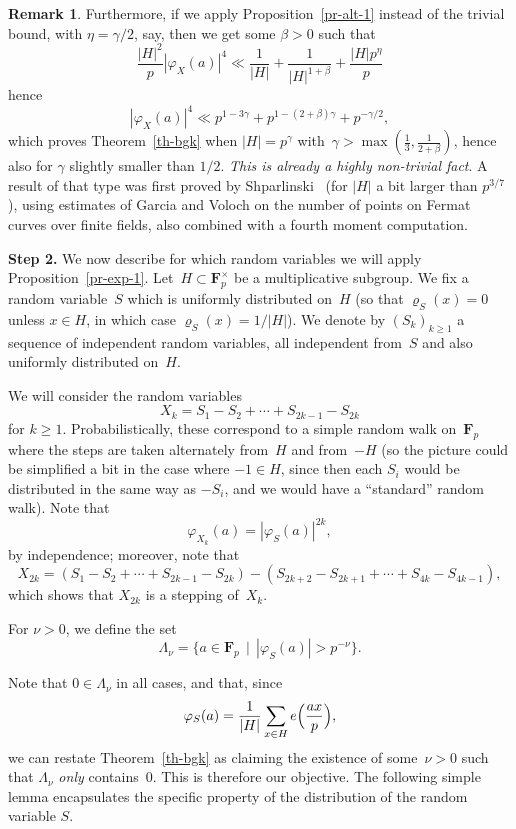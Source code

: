 \documentclass[12pt]{amsart}
\renewcommand{\geq}{\geqslant}
\numberwithin{equation}{section}
\newcommand{\Ff}{\mathbf{F}}
\renewcommand{\rho}{\varrho}
\theoremstyle{plain}
\theoremstyle{remark}
\theoremstyle{definition}
\newtheorem{remark}[theorem]{Remark}
\renewcommand{\geq}{\geqslant}
\begin{document}
\begin{remark}
  Furthermore, if we apply Proposition~\ref{pr-alt-1} instead of the
  trivial bound, with $\eta=\gamma/2$, say, then we get some $\beta>0$
  such that
  $$
  \frac{|H|^2}{p}|\varphi_X(a)|^4\ll
  \frac{1}{|H|}+\frac{1}{|H|^{1+\beta}} +\frac{|H|p^{\eta}}{p}
  $$
  hence
  $$
  |\varphi_X(a)|^4 \ll p^{1-3\gamma}+p^{1-(2+\beta)\gamma}+p^{-\gamma/2},
  $$
  which proves Theorem~\ref{th-bgk} when $|H|=p^{\gamma}$
  with~$\gamma>\max(\tfrac{1}{3},\tfrac{1}{2+\beta})$, hence also for
  $\gamma$ slightly smaller than $1/2$. \emph{This is already a highly
    non-trivial fact}. A result of that type was first proved by
  Shparlinski~\cite{shparlinski} (for $|H|$ a bit larger than
  $p^{3/7}$), using estimates of Garcia and Voloch on the number of
  points on Fermat curves over finite fields, also combined with a
  fourth moment computation.
\end{remark}

\par\medskip\par

\textbf{Step 2.} We now describe for which random variables we will
apply Proposition~\ref{pr-exp-1}.  Let~$H\subset \Ff_p^{\times}$ be a
multiplicative subgroup.  We fix a random variable~$S$ which is
uniformly distributed on~$H$ (so that $\rho_S(x)=0$ unless $x\in H$, in
which case $\rho_S(x)=1/|H|$). We denote by $(S_k)_{k\geq 1}$ a sequence
of independent random variables, all independent from~$S$ and also
uniformly distributed on~$H$.

We will consider the random variables
$$
X_k=S_1-S_2+\cdots +S_{2k-1}-S_{2k}
$$
for $k\geq 1$. Probabilistically, these correspond to a simple random
walk on~$\Ff_p$ where the steps are taken alternately from~$H$ and
from~$-H$ (so the picture could be simplified a bit in the case where
$-1\in H$, since then each $S_i$ would be distributed in the same way as
$-S_i$, and we would have a ``standard'' random walk). Note that
$$
\varphi_{X_k}(a)=|\varphi_{S}(a)|^{2k},
$$
by independence; moreover, note that
$$
X_{2k}=(S_1-S_2+\cdots +S_{2k-1}-S_{2k})-(S_{2k+2}-S_{2k+1}+\cdots
+S_{4k}-S_{4k-1}),
$$
which shows that $X_{2k}$ is a stepping of~$X_k$.

For $\nu>0$, we define the set
$$
\Lambda_{\nu}=\{a\in\Ff_p\,\mid\, |\varphi_{S}(a)|>p^{-\nu}\}.
$$

Note that $0\in\Lambda_{\nu}$ in all cases, and that, since
$$
\varphi_S(a)=\frac{1}{|H|}\sum_{x\in H}e\Bigl(\frac{ax}{p}\Bigr),
$$
we can restate Theorem~\ref{th-bgk} as claiming the existence of
some~$\nu>0$ such that $\Lambda_{\nu}$ \emph{only} contains~$0$. This is
therefore our objective. The following simple lemma encapsulates the
specific property of the distribution of the random variable $S$.
\end{document}
